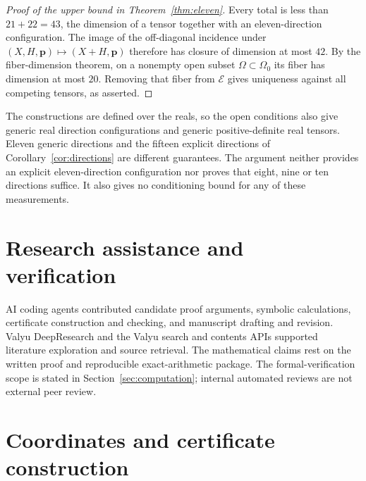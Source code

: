 \documentclass[11pt]{amsart}
\theoremstyle{remark}
\newcommand{\E}{\mathcal E}
\begin{document}
\begin{proof}[Proof of the upper bound in Theorem~\ref{thm:eleven}]
Every total is less than $21+22=43$, the dimension of a tensor together with an eleven-direction configuration. The image of the off-diagonal incidence under $(X,H,\mathbf p)\mapsto(X+H,\mathbf p)$ therefore has closure of dimension at most $42$. By the fiber-dimension theorem, on a nonempty open subset $\Omega\subset\Omega_0$ its fiber has dimension at most $20$. Removing that fiber from $\E$ gives uniqueness against all competing tensors, as asserted.
\end{proof}

The constructions are defined over the reals, so the open conditions also give generic real direction configurations and generic positive-definite real tensors. Eleven generic directions and the fifteen explicit directions of Corollary~\ref{cor:directions} are different guarantees. The argument neither provides an explicit eleven-direction configuration nor proves that eight, nine or ten directions suffice. It also gives no conditioning bound for any of these measurements.

\section*{Research assistance and verification}
AI coding agents contributed candidate proof arguments, symbolic calculations, certificate construction and checking, and manuscript drafting and revision. Valyu DeepResearch and the Valyu search and contents APIs supported literature exploration and source retrieval. The mathematical claims rest on the written proof and reproducible exact-arithmetic package. The formal-verification scope is stated in Section~\ref{sec:computation}; internal automated reviews are not external peer review.

\appendix
\section{Coordinates and certificate construction}\label{app:coordinates}
\end{document}
